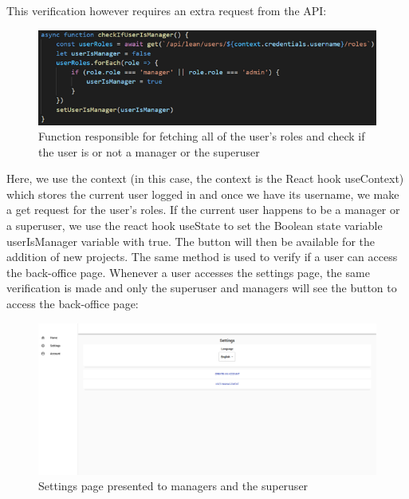 \documentclass[a4paper,twoside,10pt]{report}
\begin{document}
\pagebreak
This verification however requires an extra request from the API: 
\begin{figure}[h!]
\center
    \includegraphics[width=\textwidth]{checkIfUserIsManager.png}
\caption{Function responsible for fetching all of the user's roles and check if the user is or not a manager or the superuser}
\end{figure}

\newpage
Here, we use the context (in this case, the context is the React hook useContext) which stores the current user logged in and once we have its username, we make a get request for the user's roles. 
If the current user happens to be a manager or a superuser, we use the react hook useState to set the Boolean state variable userIsManager variable with true. The button will then be available for the addition of new projects.
The same method is used to verify if a user can access the back-office page. Whenever a user accesses the settings page, the same verification is made and only the superuser and managers will see the button to access the back-office page:

\begin{figure}[h!]
\center
    \includegraphics[width=\textwidth]{settingsPage.png}
\caption{Settings page presented to managers and the superuser}
\end{figure}
\end{document}
